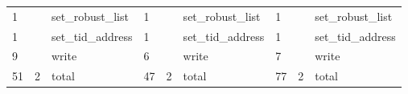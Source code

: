 \documentclass[submit,techreq,noauthor]{eco}	%
\begin{document}
\begin{table*}[t]
\begin{tabular}{|lll|lll|lll|}
  \multicolumn{1}{|l|}{1}     & \multicolumn{1}{l|}{}       & set\_robust\_list & \multicolumn{1}{l|}{1}     & \multicolumn{1}{l|}{}       & set\_robust\_list & \multicolumn{1}{l|}{1}     & \multicolumn{1}{l|}{}       & set\_robust\_list \\
  \multicolumn{1}{|l|}{1}     & \multicolumn{1}{l|}{}       & set\_tid\_address & \multicolumn{1}{l|}{1}     & \multicolumn{1}{l|}{}       & set\_tid\_address & \multicolumn{1}{l|}{1}     & \multicolumn{1}{l|}{}       & set\_tid\_address \\
  \multicolumn{1}{|l|}{9}     & \multicolumn{1}{l|}{}       & write             & \multicolumn{1}{l|}{6}     & \multicolumn{1}{l|}{}       & write             & \multicolumn{1}{l|}{7}     & \multicolumn{1}{l|}{}       & write             \\ \hline
  \multicolumn{1}{|l|}{51}    & \multicolumn{1}{l|}{2}      & total             & \multicolumn{1}{l|}{47}    & \multicolumn{1}{l|}{2}      & total             & \multicolumn{1}{l|}{77}    & \multicolumn{1}{l|}{2}      & total             \\ \hline
  \end{tabular}
  \end{table*}
\end{document}
